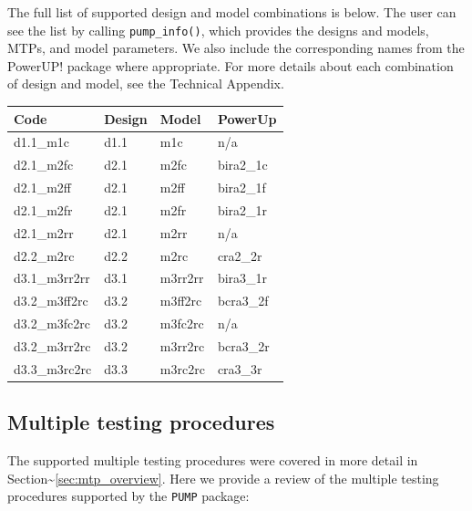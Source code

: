 \documentclass[
]{article}
\begin{document}
The full list of supported design and model combinations is below. The
user can see the list by calling \texttt{pump\_info()}, which provides
the designs and models, MTPs, and model parameters. We also include the
corresponding names from the PowerUP! package where appropriate. For
more details about each combination of design and model, see the
Technical Appendix.

\begin{tabular}{l|l|l|l}
\hline
Code & Design & Model & PowerUp\\
\hline
d1.1\_m1c & d1.1 & m1c & n/a\\
\hline
d2.1\_m2fc & d2.1 & m2fc & bira2\_1c\\
\hline
d2.1\_m2ff & d2.1 & m2ff & bira2\_1f\\
\hline
d2.1\_m2fr & d2.1 & m2fr & bira2\_1r\\
\hline
d2.1\_m2rr & d2.1 & m2rr & n/a\\
\hline
d2.2\_m2rc & d2.2 & m2rc & cra2\_2r\\
\hline
d3.1\_m3rr2rr & d3.1 & m3rr2rr & bira3\_1r\\
\hline
d3.2\_m3ff2rc & d3.2 & m3ff2rc & bcra3\_2f\\
\hline
d3.2\_m3fc2rc & d3.2 & m3fc2rc & n/a\\
\hline
d3.2\_m3rr2rc & d3.2 & m3rr2rc & bcra3\_2r\\
\hline
d3.3\_m3rc2rc & d3.3 & m3rc2rc & cra3\_3r\\
\hline
\end{tabular}

\subsection{Multiple testing procedures}

The supported multiple testing procedures were covered in more detail in
Section\textasciitilde{}\ref{sec:mtp_overview}. Here we provide a review
of the multiple testing procedures supported by the \texttt{PUMP}
package:
\end{document}
